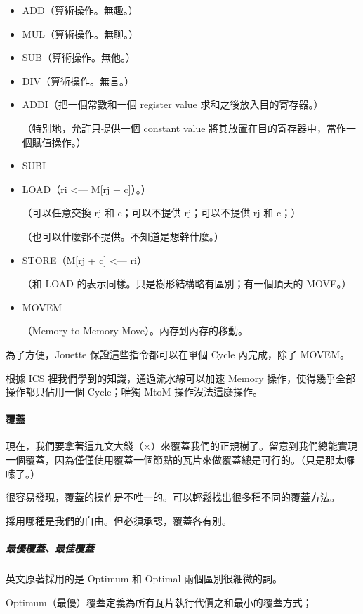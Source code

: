 \documentclass[
]{article}
\begin{document}
\begin{itemize}
\item
  ADD（算術操作。無趣。）
\item
  MUL（算術操作。無聊。）
\item
  SUB（算術操作。無他。）
\item
  DIV（算術操作。無言。）
\item
  ADDI（把一個常數和一個 register value 求和之後放入目的寄存器。）

  （特別地，允許只提供一個 constant value
  將其放置在目的寄存器中，當作一個賦值操作。）
\item
  SUBI
\item
  LOAD（ri \textless--- M{[}rj + c{]}）。）

  （可以任意交換 rj 和 c；可以不提供 rj；可以不提供 rj 和 c；）

  （也可以什麼都不提供。不知道是想幹什麼。）
\item
  STORE（M{[}rj + c{]} \textless--- ri）

  （和 LOAD 的表示同樣。只是樹形結構略有區別；有一個頂天的 MOVE。）
\item
  MOVEM

  （Memory to Memory Move）。內存到內存的移動。
\end{itemize}

為了方便，Jouette 保證這些指令都可以在單個 Cycle 內完成，除了 MOVEM。

根據 ICS 裡我們學到的知識，通過流水線可以加速 Memory
操作，使得幾乎全部操作都只佔用一個 Cycle；唯獨 MtoM 操作沒法這麼操作。

\hypertarget{header-n311}{%
\paragraph{覆蓋}\label{header-n311}}

現在，我們要拿著這九文大錢（×）來覆蓋我們的正規樹了。留意到我們總能實現一個覆蓋，因為僅僅使用覆蓋一個節點的瓦片來做覆蓋總是可行的。（只是那太囉嗦了。）

很容易發現，覆蓋的操作是不唯一的。可以輕鬆找出很多種不同的覆蓋方法。

採用哪種是我們的自由。但必須承認，覆蓋各有別。

\hypertarget{header-n315}{%
\subparagraph{最優覆蓋、最佳覆蓋}\label{header-n315}}

英文原著採用的是 Optimum 和 Optimal 兩個區別很細微的詞。

Optimum（最優）覆蓋定義為所有瓦片執行代價之和最小的覆蓋方式；
\end{document}
